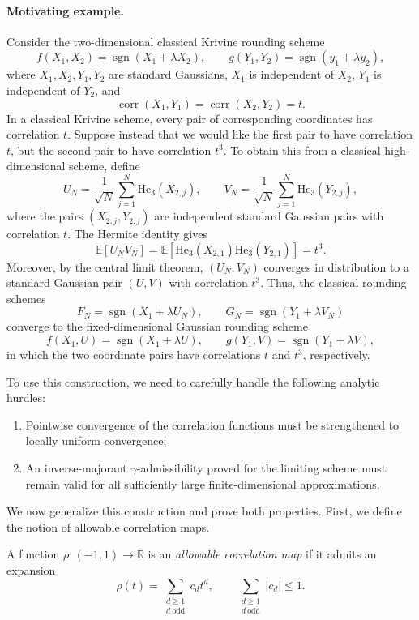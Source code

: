 \paragraph{Motivating example.}
Consider the two-dimensional classical Krivine rounding scheme
\[
f(X_1,X_2)=\operatorname{sgn}(X_1+\lambda X_2),
\qquad
g(Y_1,Y_2)=\operatorname{sgn}(y_1+\lambda y_2),
\]
where \(X_1,X_2,Y_1,Y_2\) are standard Gaussians, \(X_1\) is independent of \(X_2\), \(Y_1\) is independent of \(Y_2\), and
\[
\operatorname{corr}(X_1,Y_1)
=
\operatorname{corr}(X_2,Y_2)
=
t.
\]
In a classical Krivine scheme, every pair of corresponding coordinates has correlation \(t\). Suppose instead that we would like the first pair to have correlation \(t\), but the second pair to have correlation \(t^3\). To obtain this from a classical high-dimensional scheme, define
\[
U_N=\frac{1}{\sqrt N}\sum_{j=1}^N \mathrm{He}_3(X_{2,j}),
\qquad
V_N=\frac{1}{\sqrt N}\sum_{j=1}^N \mathrm{He}_3(Y_{2,j}),
\]
where the pairs \((X_{2,j},Y_{2,j})\) are independent standard Gaussian pairs with correlation \(t\). The Hermite identity gives
\[
\mathbb{E}[U_NV_N]
=
\mathbb{E}[\mathrm{He}_3(X_{2,1})\mathrm{He}_3(Y_{2,1})]
=
t^3.
\]
Moreover, by the central limit theorem, \((U_N,V_N)\) converges in distribution to a standard Gaussian pair \((U,V)\) with correlation \(t^3\). Thus, the classical rounding schemes
\[
F_N=\operatorname{sgn}(X_1+\lambda U_N),
\qquad
G_N=\operatorname{sgn}(Y_1+\lambda V_N)
\]
converge to the fixed-dimensional Gaussian rounding scheme
\[
f(X_1,U)=\operatorname{sgn}(X_1+\lambda U),
\qquad
g(Y_1,V)=\operatorname{sgn}(Y_1+\lambda V),
\]
in which the two coordinate pairs have correlations \(t\) and \(t^3\), respectively.

To use this construction, we need to carefully handle the following analytic hurdles:
\begin{enumerate}
    \item Pointwise convergence of the correlation functions must be strengthened to locally uniform convergence;
    \item An inverse-majorant $\gamma$-admissibility proved for the limiting scheme must remain valid for all sufficiently large finite-dimensional approximations.
\end{enumerate}

We now generalize this construction and prove both properties. First, we define the notion of allowable correlation maps.  
\begin{definition}
\label{def:allowable-correlation-map}
A function \(\rho:(-1,1)\to\mathbb{R}\) is an \emph{allowable correlation map}
if it admits an expansion
\[
\rho(t)
=
\sum_{\substack{d\geq 1\\ d\ \mathrm{odd}}} c_d t^d,
\qquad
\sum_{\substack{d\geq 1\\ d\ \mathrm{odd}}}|c_d|
\leq 1.
\]
\end{definition}

